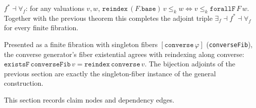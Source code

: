 \begin{theorem}\label{thm:forallF-adjunction}\leanok{}
$f^{*} \dashv \forall_{f}$: for any valuations $v, w$,
$\texttt{reindex}\,(F.\texttt{base})\,v \le_k w \iff v \le_k
\texttt{forallF}\,F\,w$. Together with the previous theorem this completes the
adjoint triple $\exists_{f} \dashv f^{*} \dashv \forall_{f}$ for every finite
fibration.
\end{theorem}
\begin{theorem}\label{thm:existsF-converse}\leanok{}
Presented as a finite fibration with singleton fibers $[\texttt{converse}\,
\varphi]$ (\texttt{converseFib}), the converse generator's fiber existential
agrees with reindexing along converse: $\texttt{existsF}\,\texttt{converseFib}\,v
= \texttt{reindex}\,\texttt{converse}\,v$. The bijection adjoints of the previous
section are exactly the singleton-fiber instance of the general construction.
\end{theorem}

This section records claim nodes and dependency edges.
